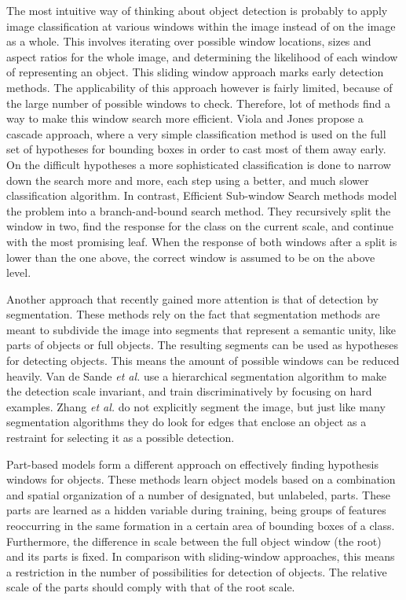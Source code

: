 \documentclass[a4paper,10pt]{article}
\begin{document}
The most intuitive way of thinking about object detection is probably to apply image classification at various windows within the image instead of on the image as a whole. This involves iterating over possible window locations, sizes and aspect ratios for the whole image, and determining the likelihood of each window of representing an object. This sliding window approach marks early detection methods.\cite{viola2004robust} The applicability of this approach however is fairly limited, because of the large number of possible windows to check. Therefore, lot of methods find a way to make this window search more efficient. Viola and Jones\cite{viola2004robust} propose a cascade approach, where a very simple classification method is used on the full set of hypotheses for bounding boxes in order to cast most of them away early. On the difficult hypotheses a more sophisticated classification is done to narrow down the search more and more, each step using a better, and much slower classification algorithm. In contrast, Efficient Sub-window Search methods\cite{lampert2008beyond,yeh2009fast,pedersoli2011coarse,behmo2010towards} model the problem into a branch-and-bound search method. They recursively split the window in two, find the response for the class on the current scale, and continue with the most promising leaf. When the response of both windows after a split is lower than the one above, the correct window is assumed to be on the above level.

Another approach that recently gained more attention is that of detection by segmentation.\cite{van2011segmentation,zhang2010free} These methods rely on the fact that segmentation methods are meant to subdivide the image into segments that represent a semantic unity, like parts of objects or full objects. The resulting segments can be used as hypotheses for detecting objects. This means the amount of possible windows can be reduced heavily. Van de Sande \emph{et al.}\cite{van2011segmentation} use a hierarchical segmentation algorithm to make the detection scale invariant, and train discriminatively by focusing on hard examples. Zhang \emph{et al.}\cite{zhang2010free} do not explicitly segment the image, but just like many segmentation algorithms they do look for edges that enclose an object as a restraint for selecting it as a possible detection.

Part-based models form a different approach on effectively finding hypothesis windows for objects.\cite{felzenszwalb2010object} These methods learn object models based on a combination and spatial organization of a number of designated, but unlabeled, parts. These parts are learned as a hidden variable during training, being groups of features reoccurring in the same formation in a certain area of bounding boxes of a class. Furthermore, the difference in scale between the full object window (the root) and its parts is fixed. In comparison with sliding-window approaches, this means a restriction in the number of possibilities for detection of objects. The relative scale of the parts should comply with that of the root scale. 
\end{document}
